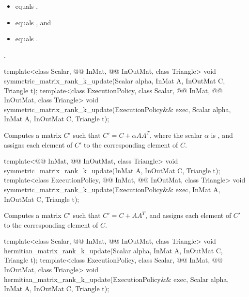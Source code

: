 \pnum
\expects
\begin{itemize}
\item
{} equals ,
\item
{} equals , and
\item
{} equals .
\end{itemize}

\pnum
\complexity
{}.

\begin{itemdecl}
  template<class Scalar, @@ InMat, @@ InOutMat, class Triangle>
    void symmetric_matrix_rank_k_update(Scalar alpha, InMat A, InOutMat C, Triangle t);
  template<class ExecutionPolicy, class Scalar,
           @@ InMat, @@ InOutMat, class Triangle>
    void symmetric_matrix_rank_k_update(ExecutionPolicy&& exec,
                                        Scalar alpha, InMat A, InOutMat C, Triangle t);
\end{itemdecl}

\begin{itemdescr}
\pnum
\effects
Computes a matrix $C'$ such that $C' = C + \alpha A A^T$,
where the scalar $\alpha$ is ,
and assigns each element of $C'$ to the corresponding element of $C$.
\end{itemdescr}

\begin{itemdecl}
template<@@ InMat, @@ InOutMat, class Triangle>
  void symmetric_matrix_rank_k_update(InMat A, InOutMat C, Triangle t);
template<class ExecutionPolicy,
         @@ InMat, @@ InOutMat, class Triangle>
  void symmetric_matrix_rank_k_update(ExecutionPolicy&& exec,
                                      InMat A, InOutMat C, Triangle t);
\end{itemdecl}

\begin{itemdescr}
\pnum
\effects
Computes a matrix $C'$ such that $C' = C + A A^T$, and
assigns each element of $C'$ to the corresponding element of $C$.
\end{itemdescr}

\begin{itemdecl}
template<class Scalar, @@ InMat, @@ InOutMat, class Triangle>
  void hermitian_matrix_rank_k_update(Scalar alpha, InMat A, InOutMat C, Triangle t);
template<class ExecutionPolicy,
         class Scalar, @@ InMat, @@ InOutMat, class Triangle>
  void hermitian_matrix_rank_k_update(ExecutionPolicy&& exec,
                                      Scalar alpha, InMat A, InOutMat C, Triangle t);
\end{itemdecl}

